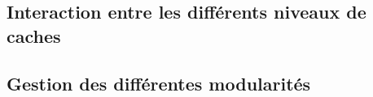 \subsection{Interaction entre les différents niveaux de caches}

\subsection{Gestion des différentes modularités}

